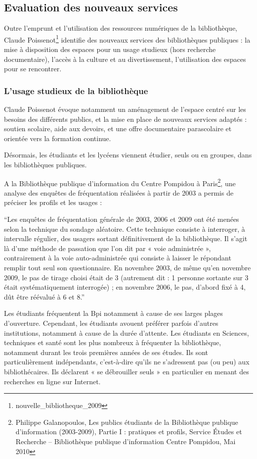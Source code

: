 \documentclass[french,a4paper,12pt]{article}
\begin{document}
\subsection{Evaluation des nouveaux services}

\quad Outre l’emprunt et l’utilisation des ressources numériques de la bibliothèque, Claude Poissenot\footnote{nouvelle_bibliotheque_2009} identifie des nouveaux services des bibliothèques publiques : la mise à disposition des espaces pour un usage studieux (hors recherche documentaire), l’accès à la culture et au divertissement, l’utilisation des espaces pour se rencontrer. 

\subsubsection{L’usage studieux de la bibliothèque}

\quad Claude Poissenot évoque notamment un aménagement de l’espace centré sur les besoins des différents publics, et la mise en place de nouveaux services adaptés :  soutien scolaire, aide aux devoirs, et une offre documentaire parascolaire et orientée vers la formation continue. 

Désormais, les étudiants et les lycéens viennent étudier, seuls ou en groupes, dans les bibliothèques publiques.  

\quad A la Bibliothèque publique d’information du Centre Pompidou à Paris\footnote{Philippe Galanopoulos, Les publics étudiants de la Bibliothèque publique d’information (2003-2009), Partie I : pratiques et profils, Service Études et Recherche – Bibliothèque publique d'information Centre Pompidou, Mai 2010}, une analyse des enquêtes de fréquentation réalisées à partir de 2003 a permis de préciser les profils et les usages : 

“Les enquêtes de fréquentation générale de 2003, 2006 et 2009 ont été menées selon la technique du sondage aléatoire. Cette technique consiste à interroger, à intervalle régulier, des usagers sortant définitivement de la bibliothèque. Il s’agit là d’une méthode de passation que l’on dit par « voie administrée », contrairement à la voie auto-administrée qui consiste à laisser le répondant remplir tout seul son questionnaire. En novembre 2003, de même qu’en novembre 2009, le pas de tirage choisi était de 3 (autrement dit : 1 personne sortante sur 3 était systématiquement interrogée) ; en novembre 2006, le pas, d’abord fixé à 4, dût être réévalué à 6 et 8.” 

Les étudiants fréquentent la Bpi notamment à cause de ses larges plages d’ouverture. Cependant, les étudiants avouent préférer parfois d’autres institutions, notamment à cause de la durée d’attente. Les étudiants en Sciences, techniques et santé sont les plus nombreux à fréquenter la bibliothèque, notamment durant les trois premières années de ses études. Ils sont particulièrement indépendants, c’est-à-dire qu’ils ne s’adressent pas (ou peu) aux bibliothécaires. Ils déclarent « se débrouiller seuls » en particulier en menant des recherches en ligne sur Internet. 
\end{document}
